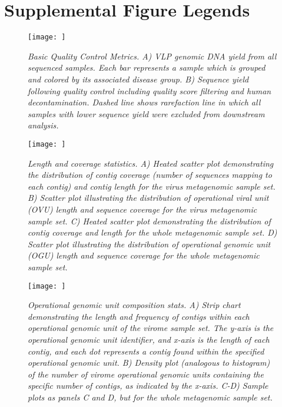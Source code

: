 \documentclass[12pt,]{article}
\newcommand{\beginsupplement}{%
        \setcounter{table}{0}
        \renewcommand{\thetable}{S\arabic{table}}%
        \setcounter{figure}{0}
        \renewcommand{\thefigure}{S\arabic{figure}}%
     }
\begin{document}
\newpage

\section{Supplemental Figure Legends}\label{supplemental-figure-legends}

\beginsupplement

\begin{figure}[htbp]
\centering
\texttt{[image: ]}
\caption{\emph{Basic Quality Control Metrics. A) VLP genomic DNA yield
from all sequenced samples. Each bar represents a sample which is
grouped and colored by its associated disease group. B) Sequence yield
following quality control including quality score filtering and human
decontamination. Dashed line shows rarefaction line in which all samples
with lower sequence yield were excluded from downstream
analysis.}\label{qualcontrol}}
\end{figure}

\newpage

\begin{figure}[htbp]
\centering
\texttt{[image: ]}
\caption{\emph{Length and coverage statistics. A) Heated scatter plot
demonstrating the distribution of contig coverage (number of sequences
mapping to each contig) and contig length for the virus metagenomic
sample set. B) Scatter plot illustrating the distribution of operational
viral unit (OVU) length and sequence coverage for the virus metagenomic
sample set. C) Heated scatter plot demonstrating the distribution of
contig coverage and length for the whole metagenomic sample set. D)
Scatter plot illustrating the distribution of operational genomic unit
(OGU) length and sequence coverage for the whole metagenomic sample
set.}\label{contigqc}}
\end{figure}

\newpage

\begin{figure}[htbp]
\centering
\texttt{[image: ]}
\caption{\emph{Operational genomic unit composition stats. A) Strip
chart demonstrating the length and frequency of contigs within each
operational genomic unit of the virome sample set. The y-axis is the
operational genomic unit identifier, and x-axis is the length of each
contig, and each dot represents a contig found within the specified
operational genomic unit. B) Density plot (analogous to histogram) of
the number of virome operational genomic units containing the specific
number of contigs, as indicated by the x-axis. C-D) Sample plots as
panels C and D, but for the whole metagenomic sample
set.}\label{clustercontigqc}}
\end{figure}
\end{document}
